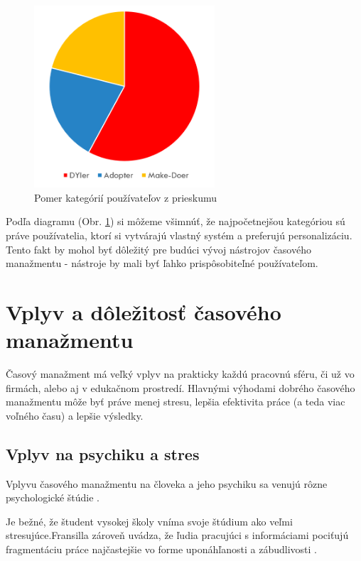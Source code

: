 \documentclass[10pt,slovak,a4paper]{article}
\begin{document}
		\paragraph{}
		\begin{figure}[tbh]
			\centering
			\includegraphics[width=0.6\textwidth]{grafkateg.png}
		\caption{Pomer kategórií používateľov z prieskumu \cite{Haraty}}
		\label{f:kategraf}
		\end{figure}
		
		Podľa diagramu (Obr. \ref{f:kategraf}) si môžeme všimnúť, že najpočetnejšou kategóriou sú práve používatelia, ktorí si vytvárajú vlastný systém a preferujú personalizáciu. Tento fakt by mohol byť dôležitý pre budúci vývoj nástrojov časového manažmentu - nástroje by mali byť ľahko prispôsobiteľné používateľom.
		
\section{Vplyv a dôležitosť časového manažmentu}

		Časový manažment má veľký vplyv na prakticky každú pracovnú sféru, či už vo firmách, alebo aj v edukačnom prostredí. Hlavnými výhodami dobrého časového manažmentu môže byť práve menej stresu, lepšia efektivita práce (a teda viac voľného času) a lepšie výsledky.
		
	\subsection{Vplyv na psychiku a stres}
	
		Vplyvu časového manažmentu na človeka a jeho psychiku sa venujú rôzne psychologické štúdie \cite{Macan}.
	
		Je bežné, že študent vysokej školy vníma svoje štúdium ako veľmi stresujúce.Fransilla zároveň uvádza, že ľudia pracujúci s informáciami pociťujú fragmentáciu práce najčastejšie vo forme uponáhľanosti a zábudlivosti \cite{Franssila}.
		
\end{document}
